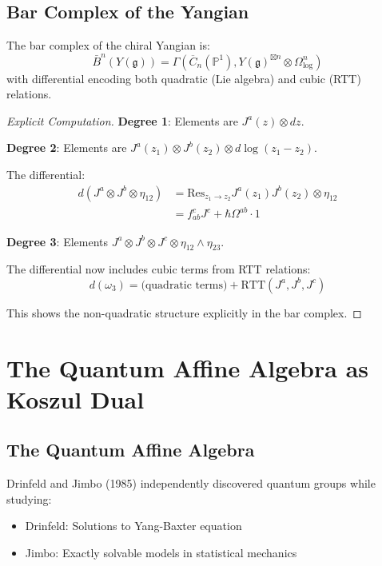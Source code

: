 \subsection{Bar Complex of the Yangian}

\begin{theorem}
The bar complex of the chiral Yangian is:
\[
\bar{B}^n(Y(\mathfrak{g})) = \Gamma\left(\overline{C}_n(\mathbb{P}^1), Y(\mathfrak{g})^{\boxtimes n} \otimes \Omega^n_{\log}\right)
\]
with differential encoding both quadratic (Lie algebra) and cubic (RTT) relations.
\end{theorem}

\begin{proof}[Explicit Computation]
\textbf{Degree 1}: Elements are $J^a(z) \otimes dz$.

\textbf{Degree 2}: Elements are $J^a(z_1) \otimes J^b(z_2) \otimes d\log(z_1 - z_2)$.

The differential:
\begin{align}
d(J^a \otimes J^b \otimes \eta_{12}) &= \text{Res}_{z_1 \to z_2} J^a(z_1)J^b(z_2) \otimes \eta_{12} \\
&= f_{ab}^c J^c + \hbar \Omega^{ab} \cdot 1
\end{align}

\textbf{Degree 3}: Elements $J^a \otimes J^b \otimes J^c \otimes \eta_{12} \wedge \eta_{23}$.

The differential now includes cubic terms from RTT relations:
\[
d(\omega_3) = \text{(quadratic terms)} + \text{RTT}(J^a, J^b, J^c)
\]

This shows the non-quadratic structure explicitly in the bar complex. \qedhere
\end{proof}


\section{The Quantum Affine Algebra as Koszul Dual}

\subsection{The Quantum Affine Algebra}

Drinfeld and Jimbo (1985) independently discovered quantum groups while studying:
\begin{itemize}
\item Drinfeld: Solutions to Yang-Baxter equation
\item Jimbo: Exactly solvable models in statistical mechanics
\end{itemize}

